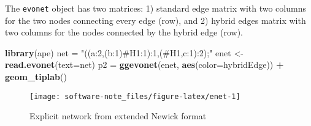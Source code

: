 \documentclass[]{IEEEtran}
\newenvironment{Shaded}{\begin{snugshade}}{\end{snugshade}}
\newcommand{\DataTypeTok}[1]{\textcolor[rgb]{0.13,0.29,0.53}{#1}}
\newcommand{\KeywordTok}[1]{\textcolor[rgb]{0.13,0.29,0.53}{\textbf{#1}}}
\newcommand{\NormalTok}[1]{#1}
\newcommand{\OperatorTok}[1]{\textcolor[rgb]{0.81,0.36,0.00}{\textbf{#1}}}
\newcommand{\StringTok}[1]{\textcolor[rgb]{0.31,0.60,0.02}{#1}}
\begin{document}
The \texttt{evonet} object has two matrices: 1) standard edge matrix with two columns for the two nodes connecting every edge (row), and 2) hybrid edges matrix with two columns for the nodes connected by the hybrid edge (row).

\begin{Shaded}
\begin{Highlighting}[]
\KeywordTok{library}\NormalTok{(ape)}
\NormalTok{net =}\StringTok{ "((a:2,(b:1)#H1:1):1,(#H1,c:1):2);"}
\NormalTok{enet <-}\StringTok{ }\KeywordTok{read.evonet}\NormalTok{(}\DataTypeTok{text=}\NormalTok{net)}
\NormalTok{p2 =}\StringTok{ }\KeywordTok{ggevonet}\NormalTok{(enet, }\KeywordTok{aes}\NormalTok{(}\DataTypeTok{color=}\NormalTok{hybridEdge)) }\OperatorTok{+}\StringTok{ }
\StringTok{    }\KeywordTok{geom_tiplab}\NormalTok{() }
\end{Highlighting}
\end{Shaded}

\begin{figure}[H]

{\centering \texttt{[image: software-note\_files/figure-latex/enet-1]} 

}

\caption{Explicit network from extended Newick format}\label{fig:enet}
\end{figure}


\end{document}

